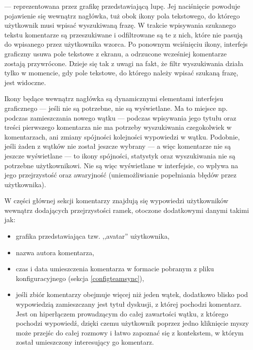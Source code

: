 \documentclass[polish,a4paper,twoside]{ppfcmthesis}
\begin{document}
\begin{description}[noitemsep]
  \item[Ikona wyszukiwania] --- reprezentowana przez grafikę przedstawiającą lupę. Jej naciśnięcie powoduje pojawienie się wewnątrz nagłówka, tuż obok ikony pola tekstowego, do którego użytkownik musi wpisać wyszukiwaną frazę. W trakcie wpisywania szukanego tekstu komentarze są przeszukiwane i odfiltrowane są te z nich, które nie pasują do wpisanego przez użytkownika wzorca. Po ponownym wciśnięciu ikony, interfejs graficzny usuwa pole tekstowe z ekranu, a odrzucone wcześniej komentarze zostają przywrócone. Dzieje się tak z uwagi na fakt, że filtr wyszukiwania działa tylko w momencie, gdy pole tekstowe, do którego należy wpisać szukaną frazę, jest widoczne.
\end{description}

Ikony będące wewnątrz nagłówka są dynamicznymi elementami interfejsu graficznego --- jeśli nie są potrzebne, nie są wyświetlane. Ma to miejsce np. podczas zamieszczania nowego wątku --- podczas wpisywania jego tytułu oraz treści pierwszego komentarza nie ma potrzeby wyszukiwania czegokolwiek w komentarzach, ani zmiany spójności kolejności wypowiedzi w wątku. Podobnie, jeśli żaden z wątków nie został jeszcze wybrany --- a więc komentarze nie są jeszcze wyświetlane --- to ikony spójności, statystyk oraz wyszukiwania nie są potrzebne użytkownikowi. Nie są więc wyświetlane w interfejsie, co wpływa na jego przejrzystość oraz awaryjność (uniemożliwianie popełniania błędów przez użytkownika).

W części głównej sekcji komentarzy znajdują się wypowiedzi użytkowników wewnątrz dodających przejrzystości ramek, otoczone dodatkowymi danymi takimi jak:

\begin{itemize}[noitemsep]
  \item grafika przedstawiająca tzw. ,,avatar'' użytkownika,
  
  \item nazwa autora komentarza,
  
  \item czas i data umieszczenia komentarza w formacie pobranym z pliku konfiguracyjnego (sekcja \ref{configteamsync}),
  
  \item jeśli zbiór komentarzy obejmuje więcej niż jeden wątek, dodatkowo blisko pod wypowiedzią zamieszczany jest tytuł dyskusji, z której pochodzi komentarz. Jest on hiperłączem prowadzącym do całej zawartości wątku, z którego pochodzi wypowiedź, dzięki czemu użytkownik poprzez jedno kliknięcie myszy może przejśc do całej rozmowy i łatwo zapoznać się z kontekstem, w którym został umieszczony interesujący go komentarz.
\end{itemize}
\end{document}
